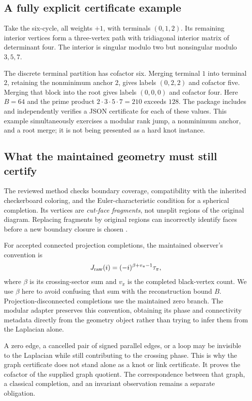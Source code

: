 \documentclass[11pt,letterpaper]{article}
\theoremstyle{definition}\newtheorem{definition}[theorem]{Definition}
\theoremstyle{remark}\newtheorem{remark}[theorem]{Remark}
\newcommand{\code}[1]{\texttt{\detokenize{#1}}}
\begin{document}
\subsection{A fully explicit certificate example}
Take the six-cycle, all weights $+1$, with terminals $(0,1,2)$. Its remaining interior vertices form a three-vertex path with tridiagonal interior matrix of determinant four. The interior is singular modulo two but nonsingular modulo $3,5,7$.

The discrete terminal partition has cofactor six. Merging terminal $1$ into terminal $2$, retaining the nonminimum anchor $2$, gives labels $(0,2,2)$ and cofactor five. Merging that block into the root gives labels $(0,0,0)$ and cofactor four. Here $B=64$ and the prime product $2\cdot3\cdot5\cdot7=210$ exceeds $128$. The package includes and independently verifies a JSON certificate for each of these values. This example simultaneously exercises a modular rank jump, a nonminimum anchor, and a root merge; it is not being presented as a hard knot instance.

\subsection{What the maintained geometry must still certify}
The reviewed \code{BoundaryTait.partition} method checks boundary coverage, compatibility with the inherited checkerboard coloring, and the Euler-characteristic condition for a spherical completion. Its vertices are \emph{cut-face fragments}, not unsplit regions of the original diagram. Replacing fragments by original regions can incorrectly identify faces before a new boundary closure is chosen \cite{boundary}.

For accepted connected projection completions, the maintained observer's convention is
\begin{equation}
 J_{\rm raw}(i)=(-i)^{\beta+v_\pi-1}\tau_\pi,
 \label{eq:phase}
\end{equation}
where $\beta$ is its crossing-sector sum and $v_\pi$ is the completed black-vertex count. We use $\beta$ here to avoid confusing that sum with the reconstruction bound $B$. Projection-disconnected completions use the maintained zero branch. The modular adapter preserves this convention, obtaining its phase and connectivity metadata directly from the geometry object rather than trying to infer them from the Laplacian alone.

A zero edge, a cancelled pair of signed parallel edges, or a loop may be invisible to the Laplacian while still contributing to the crossing phase. This is why the graph certificate does not stand alone as a knot or link certificate. It proves the cofactor of the supplied graph quotient. The correspondence between that graph, a classical completion, and an invariant observation remains a separate obligation.
\end{document}

